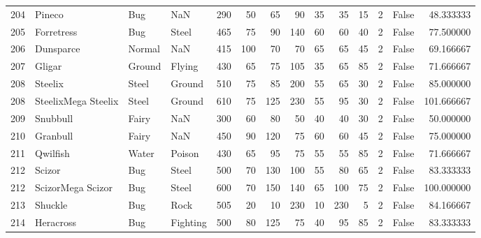 \begin{tabular}{rlllrrrrrrrrlr}
 204 &                     Pineco &       Bug &       NaN &    290 &   50 &      65 &       90 &       35 &       35 &     15 &           2 &      False &   48.333333 \\
 205 &                 Forretress &       Bug &     Steel &    465 &   75 &      90 &      140 &       60 &       60 &     40 &           2 &      False &   77.500000 \\
 206 &                  Dunsparce &    Normal &       NaN &    415 &  100 &      70 &       70 &       65 &       65 &     45 &           2 &      False &   69.166667 \\
 207 &                     Gligar &    Ground &    Flying &    430 &   65 &      75 &      105 &       35 &       65 &     85 &           2 &      False &   71.666667 \\
 208 &                    Steelix &     Steel &    Ground &    510 &   75 &      85 &      200 &       55 &       65 &     30 &           2 &      False &   85.000000 \\
 208 &        SteelixMega Steelix &     Steel &    Ground &    610 &   75 &     125 &      230 &       55 &       95 &     30 &           2 &      False &  101.666667 \\
 209 &                   Snubbull &     Fairy &       NaN &    300 &   60 &      80 &       50 &       40 &       40 &     30 &           2 &      False &   50.000000 \\
 210 &                   Granbull &     Fairy &       NaN &    450 &   90 &     120 &       75 &       60 &       60 &     45 &           2 &      False &   75.000000 \\
 211 &                   Qwilfish &     Water &    Poison &    430 &   65 &      95 &       75 &       55 &       55 &     85 &           2 &      False &   71.666667 \\
 212 &                     Scizor &       Bug &     Steel &    500 &   70 &     130 &      100 &       55 &       80 &     65 &           2 &      False &   83.333333 \\
 212 &          ScizorMega Scizor &       Bug &     Steel &    600 &   70 &     150 &      140 &       65 &      100 &     75 &           2 &      False &  100.000000 \\
 213 &                    Shuckle &       Bug &      Rock &    505 &   20 &      10 &      230 &       10 &      230 &      5 &           2 &      False &   84.166667 \\
 214 &                  Heracross &       Bug &  Fighting &    500 &   80 &     125 &       75 &       40 &       95 &     85 &           2 &      False &   83.333333 \\

\end{tabular}
